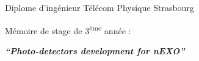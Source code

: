 \documentclass[a4paper, 12pt]{report}
\begin{document}
\vspace*{\fill}
\begin{center}
\begin{minipage}{.6\textwidth}
\begin{center}
  Diplome d'ing\'enieur T\'el\'ecom Physique Strasbourg \par
  \vspace*{1cm}
  {M\'emoire de stage de 3\textsuperscript{\`eme} ann\'ee : \par}
  \vspace*{0.5cm}
  {\textbf{\large\itshape {``Photo-detectors development for nEXO''}} \par}
\end{center}
  \end{minipage}
\end{center}
\vfill


\end{document}
